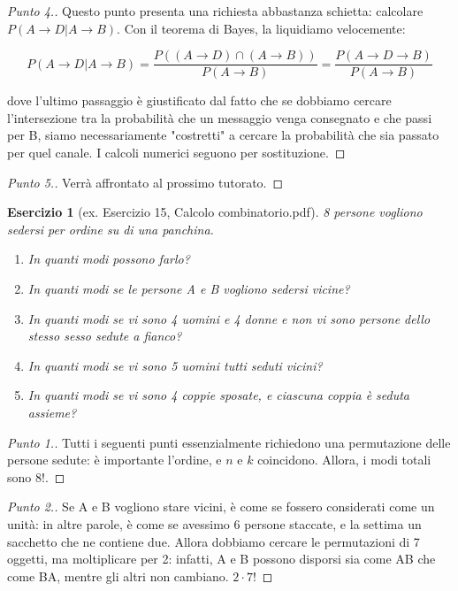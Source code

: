 \documentclass[12pt]{article}
\newtheorem{theorem}{Esercizio}
\renewcommand\qedsymbol{$\square$}
\begin{document}
\begin{proof}[Punto 4.]
	Questo punto presenta una richiesta abbastanza schietta: calcolare $P(A \rightarrow D|A \rightarrow B)$. Con il teorema di Bayes, la liquidiamo velocemente:

	\[
		P(A \rightarrow D|A \rightarrow B) = \frac{P((A \rightarrow D) \cap (A \rightarrow B))}{P(A \rightarrow B)} = \frac{P(A \rightarrow D \rightarrow B)}{P(A \rightarrow B)}
	\]

	dove l'ultimo passaggio è giustificato dal fatto che se dobbiamo cercare l'intersezione tra la probabilità che un messaggio venga consegnato e che passi per B, siamo necessariamente "costretti" a cercare la probabilità che sia passato per quel canale. I calcoli numerici seguono per sostituzione.
\end{proof}

\renewcommand\qedsymbol{$\blacksquare$}

\begin{proof}[Punto 5.]
	Verrà affrontato al prossimo tutorato.
\end{proof}

\begin{theorem}[ex. Esercizio 15, Calcolo combinatorio.pdf]
	8 persone vogliono sedersi per ordine su di una panchina.
	\begin{enumerate}
		\item In quanti modi possono farlo?
		\item In quanti modi se le persone A e B vogliono sedersi vicine?
		\item In quanti modi se vi sono 4 uomini e 4 donne e non vi sono persone dello stesso sesso sedute a fianco?
		\item In quanti modi se vi sono 5 uomini tutti seduti vicini?
		\item In quanti modi se vi sono 4 coppie sposate, e ciascuna coppia è seduta assieme?
	\end{enumerate}
\end{theorem}

\renewcommand\qedsymbol{$\square$}

\begin{proof}[Punto 1.]
	Tutti i seguenti punti essenzialmente richiedono una permutazione delle persone sedute: è importante l'ordine, e $n$ e $k$ coincidono. Allora, i modi totali sono $8!$.
\end{proof}

\begin{proof}[Punto 2.]
	Se A e B vogliono stare vicini, è come se fossero considerati come un unità: in altre parole, è come se avessimo 6 persone staccate, e la settima un sacchetto che ne contiene due. Allora dobbiamo cercare le permutazioni di 7 oggetti, ma moltiplicare per 2: infatti, A e B possono disporsi sia come AB che come BA, mentre gli altri non cambiano. $2 \cdot 7!$
\end{proof}
\end{document}
